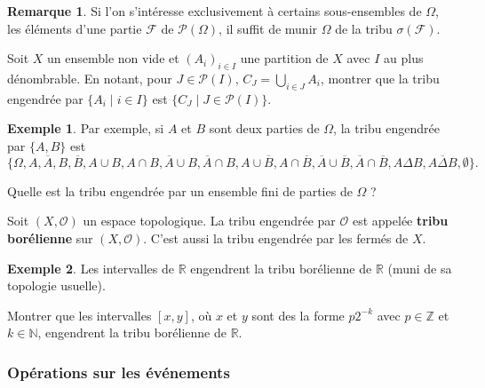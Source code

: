 \documentclass[french]{article}
\newcommand{\N}{\mathbb{N}}
\newcommand{\Z}{\mathbb{Z}}
\newcommand{\R}{\mathbb{R}}
\theoremstyle{plain}
\theoremstyle{definition}
\newtheorem*{ex}{Exemple}
\newtheorem*{rmq}{Remarque}
\theoremstyle{remark}
\begin{document}
\begin{rmq}
	Si l'on s'intéresse exclusivement à certains sous-ensembles de $\Omega$, les éléments d'une partie $\mathcal{F}$ de $\mathcal{P}(\Omega)$, il suffit de munir $\Omega$ de la tribu $\sigma(\mathcal{F})$. 
\end{rmq}

\begin{exo}
	Soit $X$ un ensemble non vide et $(A_i)_{i\in I}$ une partition de $X$ avec $I$ au plus dénombrable. En notant, pour $J\in\mathcal{P}(I)$, $C_J=\displaystyle\bigcup_{i\in J}A_i$, montrer que la tribu engendrée par $\{A_i\mid i\in I\}$ est $\{C_J\mid J\in\mathcal{P}(I)\}$.
\end{exo}

\begin{ex}
	Par exemple, si $A$ et $B$ sont deux parties de $\Omega$, la tribu engendrée par $\{A,B\}$ est $$\{\Omega,A,\overline{A},B,\overline{B},A\cup B, A\cap B, \overline{A}\cup B, \overline{A}\cap B, A\cup\overline{B}, A\cap\overline{B}, \overline{A}\cup\overline{B}, \overline{A}\cap\overline{B},A\Delta B, \overline{A\Delta B},\emptyset\}.$$
\end{ex}

\begin{exo}
	Quelle est la tribu engendrée par un ensemble fini de parties de $\Omega$ ?
\end{exo}

\begin{dfn}
	Soit $(X,\mathcal{O})$ un espace topologique. La tribu engendrée par $\mathcal{O}$ est appelée \textbf{tribu borélienne} sur $(X,\mathcal{O})$. C'est aussi la tribu engendrée par les fermés de $X$.
\end{dfn}

\begin{ex}
	Les intervalles de $\R$ engendrent la tribu borélienne de $\R$ (muni de sa topologie usuelle).
\end{ex}

\begin{exo}
	Montrer que les intervalles $[x,y]$, où $x$ et $y$ sont des la forme $p2^{-k}$ avec $p\in\Z$ et $k\in\N$, engendrent la tribu borélienne de $\R$.
\end{exo}

\subsubsection*{Opérations sur les événements}
\end{document}

